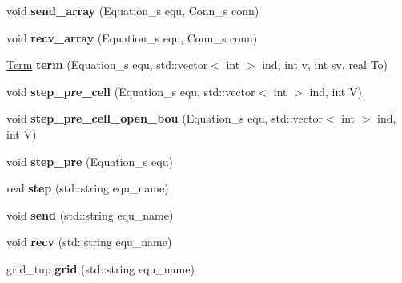 \begin{DoxyCompactItemize}
\item 
\hypertarget{classFace_afdbbc9947c0d7cd84b427bd7b503b15b}{
void {\bfseries send\_\-array} (Equation\_\-s equ, Conn\_\-s conn)}
\label{classFace_afdbbc9947c0d7cd84b427bd7b503b15b}

\item 
\hypertarget{classFace_a57bdfcf1ebf5e208b611f98b7ddeca00}{
void {\bfseries recv\_\-array} (Equation\_\-s equ, Conn\_\-s conn)}
\label{classFace_a57bdfcf1ebf5e208b611f98b7ddeca00}

\item 
\hypertarget{classFace_aa827a7d26d1b90507bb4252830b3ecf5}{
\hyperlink{structTerm}{Term} {\bfseries term} (Equation\_\-s equ, std::vector$<$ int $>$ ind, int v, int sv, real To)}
\label{classFace_aa827a7d26d1b90507bb4252830b3ecf5}

\item 
\hypertarget{classFace_aba0d776b0f0e7cceee8729825347b5cc}{
void {\bfseries step\_\-pre\_\-cell} (Equation\_\-s equ, std::vector$<$ int $>$ ind, int V)}
\label{classFace_aba0d776b0f0e7cceee8729825347b5cc}

\item 
\hypertarget{classFace_a2bafbcce9f57fd3bdefd9f23a62c853d}{
void {\bfseries step\_\-pre\_\-cell\_\-open\_\-bou} (Equation\_\-s equ, std::vector$<$ int $>$ ind, int V)}
\label{classFace_a2bafbcce9f57fd3bdefd9f23a62c853d}

\item 
\hypertarget{classFace_a8af2298846b8a666332f00de91796844}{
void {\bfseries step\_\-pre} (Equation\_\-s equ)}
\label{classFace_a8af2298846b8a666332f00de91796844}

\item 
\hypertarget{classFace_a62a7d504c1e99dfc928b7e27b544893b}{
real {\bfseries step} (std::string equ\_\-name)}
\label{classFace_a62a7d504c1e99dfc928b7e27b544893b}

\item 
\hypertarget{classFace_a781b3843f33507116afa741579317e83}{
void {\bfseries send} (std::string equ\_\-name)}
\label{classFace_a781b3843f33507116afa741579317e83}

\item 
\hypertarget{classFace_a4c67c45fa975e6fb3bc3d4ee0fa6a25f}{
void {\bfseries recv} (std::string equ\_\-name)}
\label{classFace_a4c67c45fa975e6fb3bc3d4ee0fa6a25f}

\item 
\hypertarget{classFace_a18aba75abf718dd35c17153220ad929b}{
grid\_\-tup {\bfseries grid} (std::string equ\_\-name)}
\label{classFace_a18aba75abf718dd35c17153220ad929b}

\end{DoxyCompactItemize}
